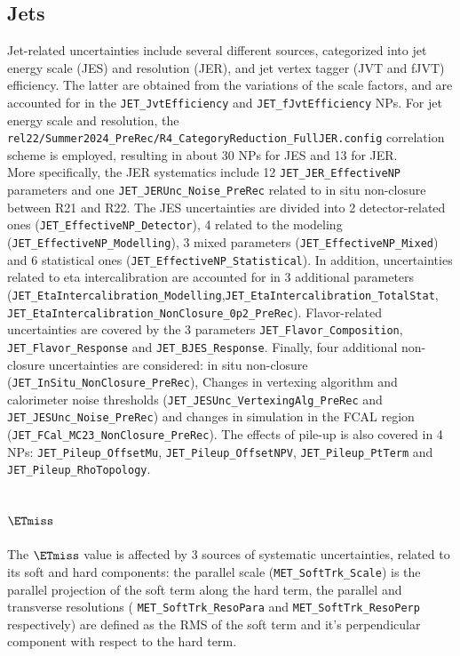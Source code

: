 \subsection{Jets}
Jet-related uncertainties include several different sources, categorized into jet energy scale (JES) and resolution (JER), and jet vertex tagger (JVT and fJVT) efficiency. The latter are obtained from the variations of the scale factors, and are accounted for in the \texttt{JET\_JvtEfficiency} and \texttt{JET\_fJvtEfficiency} NPs. 
For jet energy scale and resolution, the \texttt{rel22/Summer2024\_PreRec/R4\_CategoryReduction\_FullJER.config} correlation scheme is employed, resulting in about 30 NPs for JES and 13 for JER.\\
More specifically, the JER systematics include 12 \texttt{JET\_JER\_EffectiveNP} parameters and one \texttt{JET\_JERUnc\_Noise\_PreRec} related to in situ non-closure between R21 and R22.
The JES uncertainties are divided into 2 detector-related ones (\texttt{JET\_EffectiveNP\_Detector}), 4 related to the modeling (\texttt{JET\_EffectiveNP\_Modelling}), 3 mixed parameters (\texttt{JET\_EffectiveNP\_Mixed}) and 6 statistical ones (\texttt{JET\_EffectiveNP\_Statistical}). In addition, uncertainties related to eta intercalibration are accounted for in 3 additional parameters (\texttt{JET\_EtaIntercalibration\_Modelling},\texttt{JET\_EtaIntercalibration\_TotalStat}, \texttt{JET\_EtaIntercalibration\_NonClosure\_0p2\_PreRec}). Flavor-related uncertainties are covered by the 3 parameters \texttt{JET\_Flavor\_Composition}, \texttt{JET\_Flavor\_Response} and \texttt{JET\_BJES\_Response}. Finally, four additional non-closure uncertainties are considered: in situ non-closure (\texttt{JET\_InSitu\_NonClosure\_PreRec}), Changes in vertexing algorithm and calorimeter noise thresholds (\texttt{JET\_JESUnc\_VertexingAlg\_PreRec} and \texttt{JET\_JESUnc\_Noise\_PreRec}) and changes in simulation in the FCAL region (\texttt{JET\_FCal\_MC23\_NonClosure\_PreRec}). The effects of pile-up is also covered in 4 NPs: \texttt{JET\_Pileup\_OffsetMu}, \texttt{JET\_Pileup\_OffsetNPV}, \texttt{JET\_Pileup\_PtTerm} and \texttt{JET\_Pileup\_RhoTopology}. 

\subsection{$\ETmiss$}
The $\ETmiss$ value is affected by 3 sources of systematic uncertainties, related to its soft and hard components: the parallel scale (\texttt{MET\_SoftTrk\_Scale}) is the parallel projection of the soft term along the hard term, the parallel and transverse resolutions ( \texttt{MET\_SoftTrk\_ResoPara} and \texttt{MET\_SoftTrk\_ResoPerp} respectively) are defined as the RMS of the soft term and it’s perpendicular component with respect to the hard term. 

